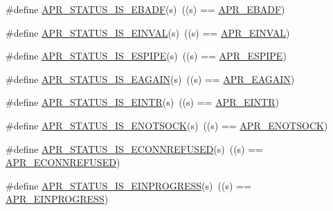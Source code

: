 \begin{DoxyCompactItemize}
\item 
\#define \mbox{\hyperlink{group___a_p_r___s_t_a_t_u_s___i_s_gaa843153a73806cca500287940e9f175f}{A\+P\+R\+\_\+\+S\+T\+A\+T\+U\+S\+\_\+\+I\+S\+\_\+\+E\+B\+A\+DF}}(s)~((s) == \mbox{\hyperlink{group___a_p_r___error_ga204df8a37a5c7fd6b2c74ea098fbac02}{A\+P\+R\+\_\+\+E\+B\+A\+DF}})
\item 
\#define \mbox{\hyperlink{group___a_p_r___s_t_a_t_u_s___i_s_ga3f620bb28c1c7f6fd3412dac2137d0fd}{A\+P\+R\+\_\+\+S\+T\+A\+T\+U\+S\+\_\+\+I\+S\+\_\+\+E\+I\+N\+V\+AL}}(s)~((s) == \mbox{\hyperlink{group___a_p_r___error_gae3ffc41994444e71ce522c036ca1d9a4}{A\+P\+R\+\_\+\+E\+I\+N\+V\+AL}})
\item 
\#define \mbox{\hyperlink{group___a_p_r___s_t_a_t_u_s___i_s_gac9b1e593377ac3b93b259f30f04a1185}{A\+P\+R\+\_\+\+S\+T\+A\+T\+U\+S\+\_\+\+I\+S\+\_\+\+E\+S\+P\+I\+PE}}(s)~((s) == \mbox{\hyperlink{group___a_p_r___error_ga3be81035cd2da76fbc27c75496489359}{A\+P\+R\+\_\+\+E\+S\+P\+I\+PE}})
\item 
\#define \mbox{\hyperlink{group___a_p_r___s_t_a_t_u_s___i_s_ga9dd578bfcd76a2d997395608ae5b3a4e}{A\+P\+R\+\_\+\+S\+T\+A\+T\+U\+S\+\_\+\+I\+S\+\_\+\+E\+A\+G\+A\+IN}}(s)~((s) == \mbox{\hyperlink{group___a_p_r___error_ga0b2a5ebb819de5ce93d326939b586578}{A\+P\+R\+\_\+\+E\+A\+G\+A\+IN}})
\item 
\#define \mbox{\hyperlink{group___a_p_r___s_t_a_t_u_s___i_s_ga30615baf6479221e44870c620e372b5b}{A\+P\+R\+\_\+\+S\+T\+A\+T\+U\+S\+\_\+\+I\+S\+\_\+\+E\+I\+N\+TR}}(s)~((s) == \mbox{\hyperlink{group___a_p_r___error_gaee1ce306c0ebf1701b34172310aa1bd5}{A\+P\+R\+\_\+\+E\+I\+N\+TR}})
\item 
\#define \mbox{\hyperlink{group___a_p_r___s_t_a_t_u_s___i_s_ga7b7807755d3d6f24e9978337b9faa5a1}{A\+P\+R\+\_\+\+S\+T\+A\+T\+U\+S\+\_\+\+I\+S\+\_\+\+E\+N\+O\+T\+S\+O\+CK}}(s)~((s) == \mbox{\hyperlink{group___a_p_r___error_gad456312527050c661dc19a8f17a0f0ef}{A\+P\+R\+\_\+\+E\+N\+O\+T\+S\+O\+CK}})
\item 
\#define \mbox{\hyperlink{group___a_p_r___s_t_a_t_u_s___i_s_ga4decf55c5cea9660a44fed0c74265ee6}{A\+P\+R\+\_\+\+S\+T\+A\+T\+U\+S\+\_\+\+I\+S\+\_\+\+E\+C\+O\+N\+N\+R\+E\+F\+U\+S\+ED}}(s)~((s) == \mbox{\hyperlink{group___a_p_r___error_ga1b4d1d847bebdfc48af343bc2486ecb8}{A\+P\+R\+\_\+\+E\+C\+O\+N\+N\+R\+E\+F\+U\+S\+ED}})
\item 
\#define \mbox{\hyperlink{group___a_p_r___s_t_a_t_u_s___i_s_ga777e9ba36fe05ac8002113a9597073ea}{A\+P\+R\+\_\+\+S\+T\+A\+T\+U\+S\+\_\+\+I\+S\+\_\+\+E\+I\+N\+P\+R\+O\+G\+R\+E\+SS}}(s)~((s) == \mbox{\hyperlink{group___a_p_r___error_ga5c311361f4f68f289c90f3cdfd77eb79}{A\+P\+R\+\_\+\+E\+I\+N\+P\+R\+O\+G\+R\+E\+SS}})

\end{DoxyCompactItemize}
